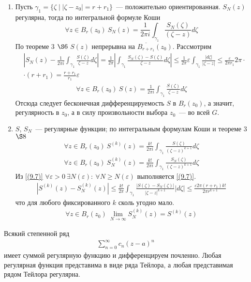 \begin{enumerate}
    \item Пусть $\gamma_1 = \{\zeta \mid \left| \zeta - z_0 \right| =
    r+r_1\}$~--- положительно ориентированная.
    $S_N(z)$ регулярна, тогда по интегральной формуле Коши
    \begin{equation}\label{(9.9)}
        \forall z \in B_r(z_0) \ S_N(z) = \frac{1}{2 \pi i}\int_{\gamma_1}\frac{S_N(\zeta)}{(\zeta - z)}d \zeta
    \end{equation}
    По теореме $3$ $\S 6$ $S(z)$ непрерывна на $\overline{B_{r+r_1}}(z_0)$.
    Рассмотрим
    \begin{align*}
      & \left| S_N(z) - \frac{1}{2 \pi i}\int_{\gamma_1}\frac{S(\zeta)}{\zeta - z} d\zeta \right| = \frac{1}{2 \pi}\left| \int_{\gamma_1} \frac{S_N(\zeta) - S(\zeta)}{\zeta - z} d \zeta \right| \leq \frac{1}{2 \pi} \varepsilon \int_{\gamma_1}\frac{\left| d \zeta \right|}{\left| \zeta - z \right|} \leq \frac{\varepsilon}{2 \pi r_1}2 \pi \cdot \\
      & \cdot (r+r_1) = \frac{r+r_1}{r_1}\varepsilon
    \end{align*}
    \begin{align*}
      \forall z \in B_r(z_0) \ S(z) = \frac{1}{2\pi i}\int_{\gamma_1}\frac{S(\zeta)}{\zeta - z}d\zeta
    \end{align*}
    Отсюда следует бесконечная дифференцируемость $S$ в $B_r(z_0)$, а значит,
    регулярность в $z_0$, а в силу произвольности выбора $z_0$~--- во всей $G$.
    \item $S$, $S_N$~--- регулярные функции; по интегральным формулам Коши и
    теореме $3$ $\S 8$
    \begin{align*}
      \forall z \in B_r(z_0) \ S^{(k)}(z) = \frac{k!}{2 \pi i} \int_{\gamma_1} \frac{S(\zeta)}{(\zeta - z)^{k+1}}d\zeta
    \end{align*}
    \begin{align*}
      \forall z \in B_r(z_0) \ S_N^{(k)}(z) = \frac{k!}{2 \pi i}\int_{\gamma_1}\frac{S_N(\zeta)}{(\zeta - z)^{k+1}} d \zeta 
    \end{align*}
    Из \eqref{(9.7)} $\forall \varepsilon > 0 \ \exists N(\varepsilon): \
    \forall N\geq N(\varepsilon)$ выполняется \eqref{(9.7)}.
    \begin{align*}
      \left| S^{(k)}(z) - S_N^{(k)}(z) \right| \leq \frac{k!}{2\pi}\int_{\gamma_1}\frac{\left| S(\zeta) - S_N(\zeta) \right|}{\left| \zeta - z \right|^{k+1}} \left| d\zeta \right|\leq \frac{\varepsilon 2 \pi (r+r_1)k!}{2 \pi r^{k+1}}
    \end{align*}
    что для любого фиксированного $k$ сколь угодно мало.
    \begin{align*}
      \forall z \in B_r(z_0) \ \lim_{N \to \infty}S^{(k)}_N (z) = S^{(k)}(z)
    \end{align*}
\end{enumerate}
\corollary
Всякий степенной ряд
\begin{align*}
  \sum_{n=0}^{\infty}c_n(z-a)^n
\end{align*}
имеет суммой регулярную функцию и дифференцируем почленно.
\corollary
Любая регулярная функция представима в виде ряда Тейлора, а любая представимая
рядом Тейлора регулярна.
